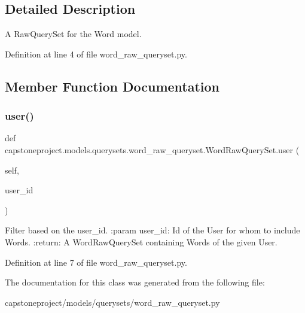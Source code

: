 \subsection{Detailed Description}
\begin{DoxyVerb}A RawQuerySet for the Word model.\end{DoxyVerb}
 

Definition at line 4 of file word\+\_\+raw\+\_\+queryset.\+py.



\subsection{Member Function Documentation}
\mbox{\label{classcapstoneproject_1_1models_1_1querysets_1_1word__raw__queryset_1_1_word_raw_query_set_a806224d9d71601d452952e2be6e443ad}} 
\subsubsection{\texorpdfstring{user()}{user()}}
{\footnotesize\ttfamily def capstoneproject.\+models.\+querysets.\+word\+\_\+raw\+\_\+queryset.\+Word\+Raw\+Query\+Set.\+user (\begin{DoxyParamCaption}\item[{}]{self,  }\item[{}]{user\+\_\+id }\end{DoxyParamCaption})}

\begin{DoxyVerb}Filter based on the user_id.
:param user_id: Id of the User for whom to include Words.
:return: A WordRawQuerySet containing Words of the given User.
\end{DoxyVerb}
 

Definition at line 7 of file word\+\_\+raw\+\_\+queryset.\+py.



The documentation for this class was generated from the following file\+:\begin{DoxyCompactItemize}
\item 
capstoneproject/models/querysets/word\+\_\+raw\+\_\+queryset.\+py\end{DoxyCompactItemize}
